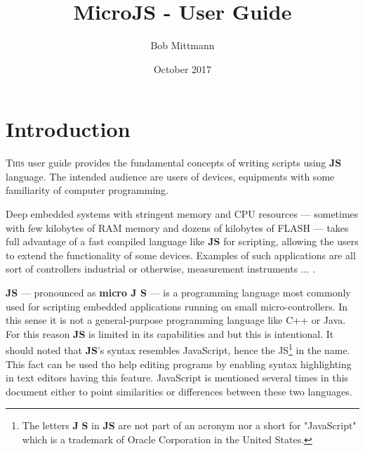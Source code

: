 

\makeatletter         
\title{MicroJS - User Guide}
\author{Bob Mittmann}
\date{October 2017}
\def\email{bobmittmann@gmail.com} %
\def\therevision{0.1} %
\let\thetitle\@title %
\makeatother



\maketitle
\thispagestyle{empty}
\newpage
{}
\tableofcontents
\newpage
\listoffigures
\newpage
\listoftables
\newpage
{}

\section{Introduction}

\lettrine{T}{his} user guide provides the fundamental concepts of writing scripts using \textbf{\textmu JS} language. The intended audience are users of devices, equipments with some familiarity of computer programming.

Deep embedded systems with stringent memory and CPU resources --- sometimes with few kilobytes of RAM memory and dozens of kilobytes of FLASH --- takes full advantage of a fast compiled language like \textbf{\textmu JS} for scripting, allowing the users to extend the functionality of some devices. Examples of such applications are all sort of controllers industrial or otherwise, measurement instruments ... .

\textbf{\textmu JS} --- pronounced as \textbf{micro J S} --- is a programming language most commonly used for scripting embedded applications running on small micro-controllers. In this sense it is not a general-purpose programming language like C++ or Java. For this reason \textbf{\textmu JS} is limited in its capabilities and but this is intentional. It should noted that \textbf{\textmu JS}'s syntax resembles JavaScript, hence the JS\footnote{The letters \textbf{J} \textbf{S} in \textbf{\textmu JS} are not part of an acronym nor a short for "JavaScript" which is a trademark of Oracle Corporation in the United States.} in the name. This fact can be used tho help editing programs by enabling syntax highlighting in text editors having this feature. JavaScript is mentioned several times in this document either to point similarities or differences between these two languages. 

